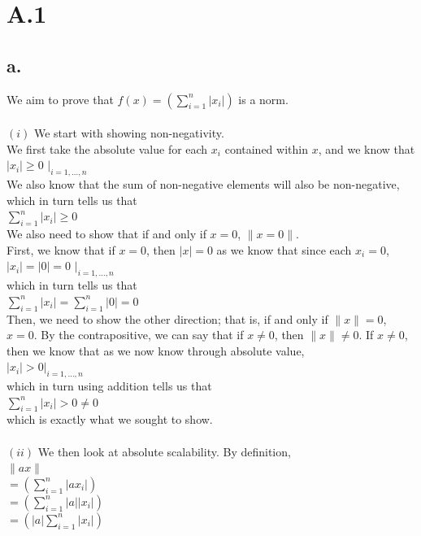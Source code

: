 \documentclass{article}
\newcommand{\1}{\mathbf{1}}
\begin{document}
\section*{A.1}
{\Large

\subsection*{a.}

We aim to prove that $f(x) = \left( \sum_{i=1}^n |x_i| \right)$ is a norm. \\ \\
$(i)$ We start with showing non-negativity. \\
We first take the absolute value for each $x_i$ contained within $x$, and we know that \\
$|x_i| \geq 0$ $|_{i = 1, \dots, n}$ \\
We also know that the sum of non-negative elements will also be non-negative, which in turn tells us that \\ 
$\sum_{i=1}^{n} |x_i| \geq 0$ \\
We also need to show that if and only if $x = 0$, $\|x = 0\|$. \\
First, we know that if $x = 0$, then $|x| = 0$ as we know that since each $x_i = 0$,  \\
$|x_i| = |0| = 0$ $|_{i = 1, \dots, n}$ \\
which in turn tells us that \\ 
$\sum_{i=1}^{n} |x_i| = \sum_{i=1}^{n} |0| = 0$ \\
Then, we need to show the other direction; that is, if and only if $\|x\| = 0$, $x = 0$. By the contrapositive, we can say that if $x \neq 0$, then $\|x\| \neq 0$. If $x \neq 0$, then we know that as we now know through absolute value, \\
$|x_i| > 0 |_{i = 1, \dots, n}$ \\
which in turn using addition tells us that  \\ 
$\sum_{i=1}^{n} |x_i| > 0 \neq 0$ \\
which is exactly what we sought to show. \\ \\
$(ii)$ We then look at absolute scalability. By definition, \\
$\|ax\| $ \\
$ = (\sum_{i=1}^{n} |ax_i|)$ \\
$ = (\sum_{i=1}^{n} |a| |x_i|)$ \\
$ = (|a| \sum_{i=1}^{n} |x_i|)$ \\
}
\end{document}
